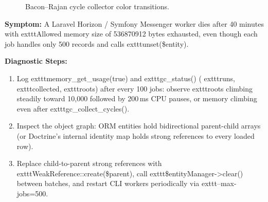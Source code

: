 \begin{figure}[htbp]
\centering
{}
\caption{Bacon--Rajan cycle collector color transitions.}
\label{fig:v1-ch03-gc-states}
\end{figure}

\begin{realworldbox}
\textbf{Symptom:} A Laravel Horizon / Symfony Messenger worker dies after 40 minutes with 	exttt{Allowed memory size of 536870912 bytes exhausted}, even though each job handles only 500 records and calls 	exttt{unset(\$entity)}.

\textbf{Diagnostic Steps:}
\begin{enumerate}[leftmargin=15pt,itemsep=2pt]
  \item Log 	exttt{memory\_get\_usage(true)} and 	exttt{gc\_status()} (	exttt{runs}, 	exttt{collected}, 	exttt{roots}) after every 100 jobs: observe 	exttt{roots} climbing steadily toward 10,000 followed by 200\,ms CPU pauses, or memory climbing even after 	exttt{gc\_collect\_cycles()}.
  \item Inspect the object graph: ORM entities hold bidirectional parent-child arrays (or Doctrine's internal identity map holds strong references to every loaded row).
  \item Replace child-to-parent strong references with 	exttt{WeakReference::create(\$parent)}, call 	exttt{\$entityManager->clear()} between batches, and restart CLI workers periodically via 	exttt{--max-jobs=500}.
\end{enumerate}
\end{realworldbox}

